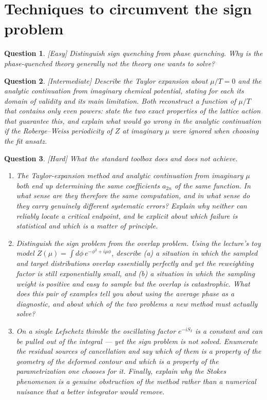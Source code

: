 \documentclass[11pt]{article}
\newcommand{\diff}[1]{\textcolor{blue!60!black}{\footnotesize\textsf{[#1]}}\quad}
\newtheorem{question}{Question}
\begin{document}
\section{Techniques to circumvent the sign problem}

\begin{question}
\diff{Easy} Distinguish sign quenching from phase quenching. Why is the phase-quenched theory generally not the theory one wants to solve?
\end{question}

\begin{question}
\diff{Intermediate} Describe the Taylor expansion about $\mu/T=0$ and the analytic continuation from imaginary chemical potential, stating for each its domain of validity and its main limitation. Both reconstruct a function of $\mu/T$ that contains only \emph{even} powers: state the two exact properties of the lattice action that guarantee this, and explain what would go wrong in the analytic continuation if the Roberge--Weiss periodicity of $Z$ at imaginary $\mu$ were ignored when choosing the fit ansatz.
\end{question}

\begin{question}
\diff{Hard} What the standard toolbox does and does not achieve.
\begin{enumerate}[label=(\roman*), leftmargin=*]
  \item The Taylor-expansion method and analytic continuation from imaginary $\mu$ both end up determining the same coefficients $a_{2n}$ of the same function. In what sense are they therefore the same computation, and in what sense do they carry genuinely different systematic errors? Explain why neither can reliably locate a critical endpoint, and be explicit about which failure is statistical and which is a matter of principle.
  \item Distinguish the \emph{sign problem} from the \emph{overlap problem}. Using the lecture's toy model $Z(\mu) = \int d\phi\, e^{-\phi^2 + i\mu\phi}$, describe (a) a situation in which the sampled and target distributions overlap essentially perfectly and yet the reweighting factor is still exponentially small, and (b) a situation in which the sampling weight is positive and easy to sample but the overlap is catastrophic. What does this pair of examples tell you about using the average phase as a diagnostic, and about which of the two problems a new method must actually solve?
  \item On a single Lefschetz thimble the oscillating factor $e^{-iS_I}$ is a constant and can be pulled out of the integral --- yet the sign problem is not solved. Enumerate the residual sources of cancellation and say which of them is a property of the \emph{geometry} of the deformed contour and which is a property of the \emph{parametrization} one chooses for it. Finally, explain why the Stokes phenomenon is a genuine obstruction of the method rather than a numerical nuisance that a better integrator would remove.
\end{enumerate}
\end{question}
\end{document}
